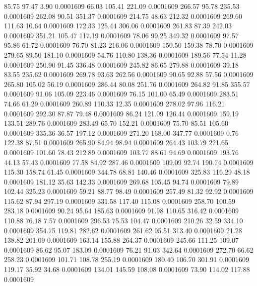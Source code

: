   85.75   97.47    3.90   0.0001609
  66.03  105.41  221.09   0.0001609
 266.57   95.78  235.53   0.0001609
 262.08   90.51  351.37   0.0001609
 214.75   48.63  212.32   0.0001609
 269.60  111.63   10.64   0.0001609
 172.33  125.44  306.06   0.0001609
 261.83   87.39  242.03   0.0001609
 351.21  105.47  117.19   0.0001609
  78.06   99.25  349.32   0.0001609
  97.57   95.86   61.72   0.0001609
  76.70   81.23  216.06   0.0001609
 150.50  159.38   78.70   0.0001609
 279.65   89.50  181.10   0.0001609
  54.76  110.80  138.36   0.0001609
 189.56   77.54   11.28   0.0001609
 250.90   91.45  336.48   0.0001609
 245.82   86.65  279.88   0.0001609
  39.18   83.55  235.62   0.0001609
 269.78   93.63  262.56   0.0001609
  90.65   92.88   57.56   0.0001609
 265.80  105.02   56.19   0.0001609
 286.44   80.08  251.76   0.0001609
 264.82   91.85  355.57   0.0001609
  91.06  105.09  223.46   0.0001609
  76.15  101.00   65.49   0.0001609
 283.51   74.66   61.29   0.0001609
 260.89  110.33   12.35   0.0001609
 278.02   97.96  116.21   0.0001609
 292.30   87.87   79.48   0.0001609
  86.24  121.09  126.44   0.0001609
 159.19  133.51  289.76   0.0001609
 283.49   65.70  152.21   0.0001609
  75.70   85.51  105.60   0.0001609
 335.36   36.57  197.12   0.0001609
 271.20  168.00  347.77   0.0001609
   0.76  122.38   87.51   0.0001609
 265.90   84.94   98.94   0.0001609
 264.43  103.79  221.65   0.0001609
 101.60   78.43  212.89   0.0001609
 103.77   88.61   94.69   0.0001609
 193.76   44.13   57.43   0.0001609
  77.58   84.92  287.46   0.0001609
 109.09   92.74  190.74   0.0001609
 115.30  158.74   61.45   0.0001609
 344.78   68.81  140.46   0.0001609
 325.83  116.29   48.18   0.0001609
 181.12   35.63  142.33   0.0001609
 269.68  105.45   94.74   0.0001609
  79.89  102.44  325.23   0.0001609
  59.21   88.77   98.49   0.0001609
 257.49   81.32   92.92   0.0001609
 115.62   87.94  297.19   0.0001609
 331.58  117.40  115.08   0.0001609
 258.70  100.59  283.18   0.0001609
  90.24   95.64  185.63   0.0001609
  91.98  110.65  316.42   0.0001609
 110.88   76.18    7.57   0.0001609
 296.53   75.53  104.47   0.0001609
 210.26   32.59  334.10   0.0001609
 354.75  119.81  282.62   0.0001609
 261.62   95.51  313.40   0.0001609
  21.28  138.82  201.09   0.0001609
 163.14  155.88  264.37   0.0001609
 245.66  111.25  109.07   0.0001609
  86.62   95.07  183.09   0.0001609
  76.21   91.03  342.64   0.0001609
 272.70   66.62  258.23   0.0001609
 101.71  108.78  255.19   0.0001609
 180.40  106.70  301.91   0.0001609
 119.17   35.92   34.68   0.0001609
 134.01  145.59  108.08   0.0001609
  73.90  114.02  117.88   0.0001609
